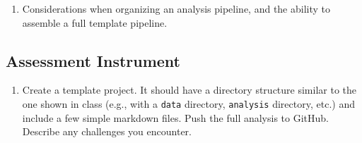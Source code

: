 \begin{enumerate}
    \item Considerations when organizing an analysis pipeline, and the ability to assemble a full template pipeline.
\end{enumerate}

\subsection{Assessment Instrument}

\begin{enumerate}
    \item Create a template project. It should have a directory structure similar to the one shown in class (e.g., with a \texttt{data} directory, \texttt{analysis} directory, etc.) and include a few simple markdown files. Push the full analysis to GitHub. Describe any challenges you encounter.
\end{enumerate}


